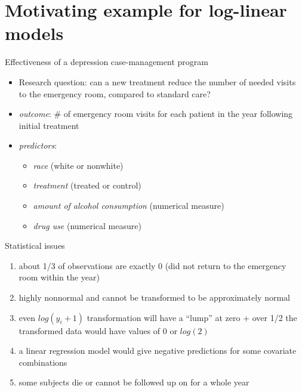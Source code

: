 \documentclass[ignorenonframetext,]{beamer}
\providecommand{\tightlist}{%
  \setlength{\itemsep}{0pt}\setlength{\parskip}{0pt}}
\begin{document}
\hypertarget{motivating-example-for-log-linear-models}{%
\section{Motivating example for log-linear
models}\label{motivating-example-for-log-linear-models}}

\begin{frame}{Effectiveness of a depression case-management program}
\protect\hypertarget{effectiveness-of-a-depression-case-management-program}{}

\begin{itemize}
\tightlist
\item
  Research question: can a new treatment reduce the number of needed
  visits to the emergency room, compared to standard care?
\item
  \emph{outcome}: \# of emergency room visits for each patient in the
  year following initial treatment
\item
  \emph{predictors}:

  \begin{itemize}
  \tightlist
  \item
    \emph{race} (white or nonwhite)
  \item
    \emph{treatment} (treated or control)
  \item
    \emph{amount of alcohol consumption} (numerical measure)
  \item
    \emph{drug use} (numerical measure)
  \end{itemize}
\end{itemize}

\end{frame}

\begin{frame}{Statistical issues}
\protect\hypertarget{statistical-issues}{}

\begin{enumerate}
\tightlist
\item
  about 1/3 of observations are exactly 0 (did not return to the
  emergency room within the year)
\item
  highly nonnormal and cannot be transformed to be approximately normal
\item
  even \(log(y_i + 1)\) transformation will have a ``lump'' at zero +
  over 1/2 the transformed data would have values of 0 or \(log(2)\)
\item
  a linear regression model would give negative predictions for some
  covariate combinations
\item
  some subjects die or cannot be followed up on for a whole year
\end{enumerate}

\end{frame}
\end{document}
